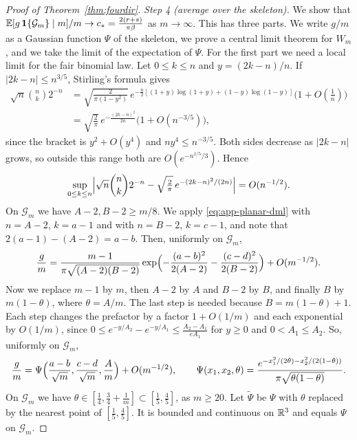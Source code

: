 \begin{proof}[Proof of Theorem~\ref{thm:fourdir}]
\emph{Step 4 (average over the skeleton).} We show that
$\mathbb{E}[g\,\mathbf 1\{\mathcal G_m\}\mid m]/m\to c_*=\frac{2(r+s)}{\pi\beta}$ as $m\to\infty$. This has
three parts. We write $g/m$ as a Gaussian function $\Psi$ of the skeleton, we prove a central limit
theorem for $W_m$, and we take the limit of the expectation of $\Psi$. For the first part we
need a local limit for the fair binomial law. Let $0\le k\le n$ and $y=(2k-n)/n$. If
$\lvert2k-n\rvert\le n^{3/5}$, Stirling's formula gives
\begin{align*}
 \sqrt n\binom nk2^{-n}&=\sqrt{\frac2{\pi(1-y^2)}}\,
 e^{-\frac n2[(1+y)\log(1+y)+(1-y)\log(1-y)]}\bigl(1+O(\tfrac1n)\bigr)\\
 &=\sqrt{\frac2\pi}\,e^{-\frac{(2k-n)^2}{2n}}\bigl(1+O(n^{-3/5})\bigr),
\end{align*}
since the bracket is $y^2+O(y^4)$ and $ny^4\le n^{-3/5}$. Both sides decrease as $\lvert2k-n\rvert$
grows, so outside this range both are $O(e^{-n^{1/5}/3})$. Hence
\begin{equation}\label{eq:app-planar-dml}
 \sup_{0\le k\le n}\Bigl\lvert\sqrt n\binom nk2^{-n}-\sqrt{\tfrac2\pi}\,e^{-(2k-n)^2/(2n)}\Bigr\rvert
 =O(n^{-1/2}).
\end{equation}
On $\mathcal G_m$ we have $A-2,B-2\ge m/8$. We apply \eqref{eq:app-planar-dml} with $n=A-2$,
$k=a-1$ and with $n=B-2$, $k=c-1$, and note that $2(a-1)-(A-2)=a-b$. Then, uniformly on
$\mathcal G_m$,
\[
 \frac gm=\frac{m-1}{\pi\sqrt{(A-2)(B-2)}}
 \exp\Bigl(-\frac{(a-b)^2}{2(A-2)}-\frac{(c-d)^2}{2(B-2)}\Bigr)+O(m^{-1/2}).
\]
Now we replace $m-1$ by $m$, then $A-2$ by $A$ and $B-2$ by $B$, and finally $B$ by $m(1-\theta)$,
where $\theta=A/m$. The last step is needed because $B=m(1-\theta)+1$. Each step changes the
prefactor by a factor $1+O(1/m)$ and each exponential by $O(1/m)$, since
$0\le e^{-y/A_2}-e^{-y/A_1}\le\frac{A_2-A_1}{eA_1}$ for $y\ge0$ and $0<A_1\le A_2$. So, uniformly on
$\mathcal G_m$,
\[
 \frac gm=\Psi\Bigl(\frac{a-b}{\sqrt m},\frac{c-d}{\sqrt m},\frac Am\Bigr)+O(m^{-1/2}),\qquad
 \Psi(x_1,x_2,\theta)=\frac{e^{-x_1^2/(2\theta)-x_2^2/(2(1-\theta))}}{\pi\sqrt{\theta(1-\theta)}}.
\]
On $\mathcal G_m$ we have $\theta\in[\frac14,\frac34+\frac1m]\subset[\frac15,\frac45]$, as $m\ge20$.
Let $\tilde\Psi$ be $\Psi$ with $\theta$ replaced by the nearest point of $[\frac15,\frac45]$. It is
bounded and continuous on $\mathbb{R}^3$ and equals $\Psi$ on $\mathcal G_m$.


\end{proof}
